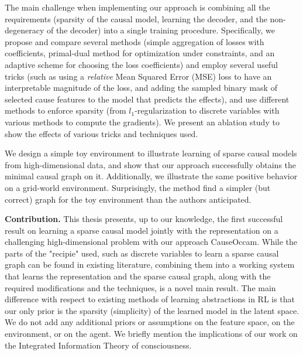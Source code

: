\documentclass[a4paper,11pt,oneside]{report}
\newcommand{\sysname}{CauseOccam\xspace}
\begin{document}
The main challenge when implementing our approach is combining all the requirements (sparsity of the causal model, learning the decoder, and the non-degeneracy of the decoder) into a single training procedure. Specifically, we propose and compare several methods (simple aggregation of losses with coefficients, primal-dual method for optimization under constraints, and an adaptive scheme for choosing the loss coefficients) and employ several useful tricks (such as using a {\em relative} Mean Squared Error (MSE) loss to have an interpretable magnitude of the loss, and adding the sampled binary mask of selected cause features to the model that predicts the effects), and use different methods to enforce sparsity (from $l_1$-regularization to discrete variables with various methods to compute the gradients). We present an ablation study to show the effects of various tricks and techniques used.

We design a simple toy environment to illustrate learning of sparse causal models from high-dimensional data, and show that our approach successfully obtains the minimal causal graph on it. Additionally, we illustrate the same positive behavior on a grid-world environment. Surprisingly, the method find a simpler (but correct) graph for the toy environment than the authors anticipated.

{\bf Contribution.} This thesis presents, up to our knowledge, the first successful result on learning a sparse causal model jointly with the representation on a challenging high-dimensional problem with our approach \sysname. While the parts of the "recipie" used, such as discrete variables to learn a sparse causal graph can be found in existing literature, combining them into a working system that learns the representation and the sparse causal graph, along with the required modifications and the techniques, is a novel main result. The main difference with respect to existing methods of learning abstractions in RL is that our only prior is the sparsity (simplicity) of the learned model in the latent space. We do not add any additional priors or assumptions \cite{Francois-Lavet2018,Ying2020} on the feature space, on the environment, or on the agent. We briefly mention the implications of our work on the Integrated Information Theory \cite{Tononi2016} of consciousness.
\end{document}
